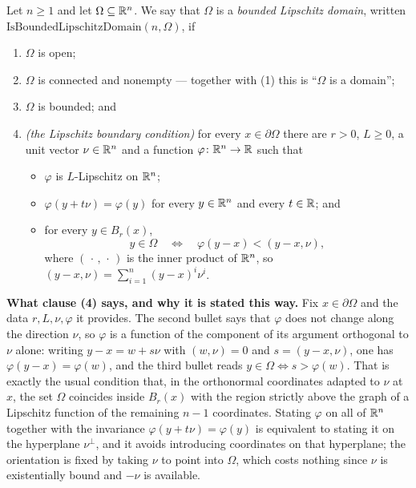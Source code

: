 \begin{definition}
Let $n\ge1$ and let $\Omega\subseteq\mathbb{R}^n$.  We say that $\Omega$ is a
\emph{bounded Lipschitz domain}, written
$\mathrm{IsBoundedLipschitzDomain}(n,\Omega)$, if
\begin{enumerate}
\item $\Omega$ is open;
\item $\Omega$ is connected and nonempty --- together with (1) this is
  ``$\Omega$ is a domain'';
\item $\Omega$ is bounded; and
\item \emph{(the Lipschitz boundary condition)} for every $x\in\partial\Omega$
  there are $r>0$, $L\ge0$, a unit vector $\nu\in\mathbb{R}^n$ and a function
  $\varphi\colon\mathbb{R}^n\to\mathbb{R}$ such that
  \begin{itemize}
  \item $\varphi$ is $L$-Lipschitz on $\mathbb{R}^n$;
  \item $\varphi(y+t\nu)=\varphi(y)$ for every $y\in\mathbb{R}^n$ and every $t\in\mathbb{R}$;
    and
  \item for every $y\in B_r(x)$,
    \[
    y\in\Omega\quad\Longleftrightarrow\quad \varphi(y-x)<(y-x,\nu),
    \]
    where $(\,\cdot\,,\,\cdot\,)$ is the inner product of $\mathbb{R}^n$, so
    $(y-x,\nu)=\sum_{i=1}^n(y-x)^i\nu^i$.
  \end{itemize}
\end{enumerate}

\noindent\textbf{What clause (4) says, and why it is stated this way.}  Fix
$x\in\partial\Omega$ and the data $r,L,\nu,\varphi$ it provides.  The second
bullet says that $\varphi$ does not change along the direction $\nu$, so
$\varphi$ is a function of the component of its argument orthogonal to $\nu$
alone: writing $y-x=w+s\nu$ with $(w,\nu)=0$ and $s=(y-x,\nu)$, one has
$\varphi(y-x)=\varphi(w)$, and the third bullet reads
$y\in\Omega\iff s>\varphi(w)$.  That is exactly the usual condition that, in the
orthonormal coordinates adapted to $\nu$ at $x$, the set $\Omega$ coincides
inside $B_r(x)$ with the region strictly above the graph of a Lipschitz function
of the remaining $n-1$ coordinates.  Stating $\varphi$ on all of $\mathbb{R}^n$ together
with the invariance $\varphi(y+t\nu)=\varphi(y)$ is equivalent to stating it on
the hyperplane $\nu^{\perp}$, and it avoids introducing coordinates on that
hyperplane; the orientation is fixed by taking $\nu$ to point into $\Omega$,
which costs nothing since $\nu$ is existentially bound and $-\nu$ is available.


\end{definition}
